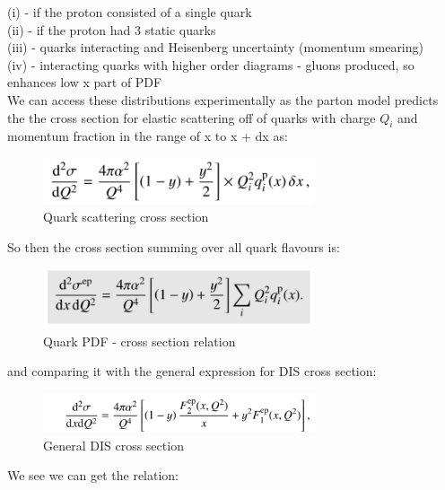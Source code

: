         (i) - if the proton consisted of a single quark\\
        (ii) - if the proton had 3 static quarks\\
        (iii) - quarks interacting and Heisenberg uncertainty (momentum smearing)\\
        (iv) - interacting quarks with higher order diagrams - gluons produced, so enhances low x part of PDF\\
        \newline
        We can access these distributions experimentally as the parton model predicts the the cross section for elastic scattering off of quarks with charge $Q_i$ and momentum fraction in the range of x to x + dx as:
        
               
        \begin{figure}[H]
            \centering
            \includegraphics[width=8cm]{Chapters/Ch1-Intro/Ch1-Sec1-Background/pics/inelastic-ep/quark-x.PNG}
            \caption{Quark scattering cross section}
        \end{figure}
        
        So then the cross section summing over all quark flavours is:
        
               
        \begin{figure}[H]
            \centering
            \includegraphics[width=8cm]{Chapters/Ch1-Intro/Ch1-Sec1-Background/pics/inelastic-ep/quark-x-sum.PNG}
            \caption{Quark PDF - cross section relation}
        \end{figure}
        
        and comparing it with the general expression for DIS cross section:
        
                
        \begin{figure}[H]
            \centering
            \includegraphics[width=8cm]{Chapters/Ch1-Intro/Ch1-Sec1-Background/pics/inelastic-ep/inel-general.PNG}
            \caption{General DIS cross section}
        \end{figure}
        We see we can get the relation:
        
